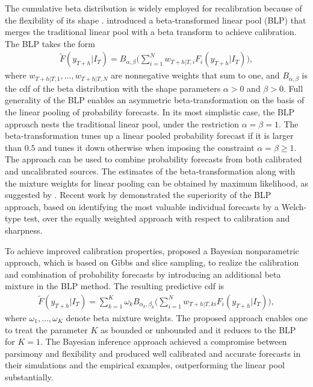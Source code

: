 \documentclass[11pt]{article}
\begin{document}
The cumulative beta distribution is widely employed for recalibration because of the flexibility of its shape \citep[see, e.g.,][]{Graham1996-qc}. \citet{Ranjan2010-jl} introduced a beta-transformed linear pool (BLP) that merges the traditional linear pool with a beta transform to achieve calibration. The BLP takes the form
\begin{align*}
  \tilde{F}(y_{T+h}|I_{T}) = B_{\alpha, \beta}\bigg(\sum_{i=1}^{N} w_{T+h|T,i} F_{i}(y_{T+h}|I_{T})\bigg),
\end{align*}
where $w_{T+h|T,1},\dots,w_{T+h|T,N}$ are nonnegative weights that sum to one, and $B_{\alpha, \beta}$ is the cdf of the beta distribution with the shape parameters $\alpha > 0$ and $\beta > 0$. Full generality of the BLP enables an asymmetric beta-transformation on the basis of the linear pooling of probability forecasts. In its most simplistic case, the BLP approach nests the traditional linear pool, under the restriction $\alpha = \beta = 1$. The beta-transformation tunes up a linear pooled probability forecast if it is larger than $0.5$ and tunes it down otherwise when imposing the constraint $\alpha = \beta \geq 1$. The approach can be used to combine probability forecasts from both calibrated and uncalibrated sources. The estimates of the beta-transformation along with the mixture weights for linear pooling can be obtained by maximum likelihood, as suggested by \citet{Ranjan2010-jl}. Recent work by \citet{Lahiri2015-qq} demonstrated the superiority of the BLP approach, based on identifying the most valuable individual forecasts by a Welch-type test, over the equally weighted approach with respect to calibration and sharpness.

To achieve improved calibration properties, \citet{Bassetti2018-qr} proposed a Bayesian nonparametric approach, which is based on Gibbs and slice sampling, to realize the calibration and combination of probability forecasts by introducing an additional beta mixture in the BLP method. The resulting predictive cdf is
\begin{align*}
  \tilde{F}(y_{T+h}|I_{T}) = \sum_{k=1}^{K} \omega_{k} B_{\alpha_{k}, \beta_{k}}\bigg(\sum_{i=1}^{N} w_{T+h|T,ki} F_{i}(y_{T+h}|I_{T})\bigg),
\end{align*}
where $\omega_{1}, \dots, \omega_{K}$ denote beta mixture weights. The proposed approach enables one to treat the parameter $K$ as bounded or unbounded and it reduces to the BLP for $K=1$. The Bayesian inference approach achieved a compromise between parsimony and flexibility and produced well calibrated and accurate forecasts in their simulations and the empirical examples, outperforming the linear pool substantially.
\end{document}

